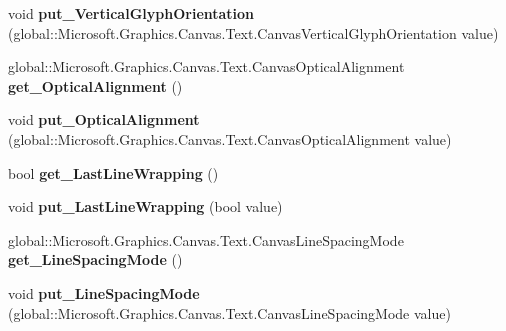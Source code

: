 \begin{DoxyCompactItemize}
void {\bfseries put\+\_\+\+Vertical\+Glyph\+Orientation} (global\+::\+Microsoft.\+Graphics.\+Canvas.\+Text.\+Canvas\+Vertical\+Glyph\+Orientation value)
\item 
\mbox{\label{interface_microsoft_1_1_graphics_1_1_canvas_1_1_text_1_1_i_canvas_text_format_a6266ab0128ef88ed3a47c3b55f8d882a}} 
global\+::\+Microsoft.\+Graphics.\+Canvas.\+Text.\+Canvas\+Optical\+Alignment {\bfseries get\+\_\+\+Optical\+Alignment} ()
\item 
\mbox{\label{interface_microsoft_1_1_graphics_1_1_canvas_1_1_text_1_1_i_canvas_text_format_af5a78a267574fdae1a3a594f0d0e7d06}} 
void {\bfseries put\+\_\+\+Optical\+Alignment} (global\+::\+Microsoft.\+Graphics.\+Canvas.\+Text.\+Canvas\+Optical\+Alignment value)
\item 
\mbox{\label{interface_microsoft_1_1_graphics_1_1_canvas_1_1_text_1_1_i_canvas_text_format_adc2620964bc8e505aa61c08c6ac78893}} 
bool {\bfseries get\+\_\+\+Last\+Line\+Wrapping} ()
\item 
\mbox{\label{interface_microsoft_1_1_graphics_1_1_canvas_1_1_text_1_1_i_canvas_text_format_a3edf3bb3860fd65883e2b0a45e28b8b4}} 
void {\bfseries put\+\_\+\+Last\+Line\+Wrapping} (bool value)
\item 
\mbox{\label{interface_microsoft_1_1_graphics_1_1_canvas_1_1_text_1_1_i_canvas_text_format_ab83d69682b1282cc0203333291e4df42}} 
global\+::\+Microsoft.\+Graphics.\+Canvas.\+Text.\+Canvas\+Line\+Spacing\+Mode {\bfseries get\+\_\+\+Line\+Spacing\+Mode} ()
\item 
\mbox{\label{interface_microsoft_1_1_graphics_1_1_canvas_1_1_text_1_1_i_canvas_text_format_a1a3230a7d36b210e60927960396f0c69}} 
void {\bfseries put\+\_\+\+Line\+Spacing\+Mode} (global\+::\+Microsoft.\+Graphics.\+Canvas.\+Text.\+Canvas\+Line\+Spacing\+Mode value)
\item 

\end{DoxyCompactItemize}
